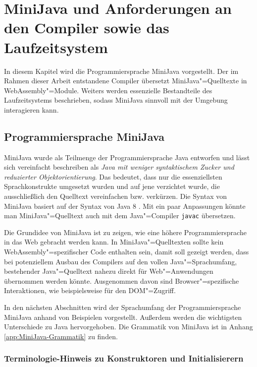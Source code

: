 \chapter{MiniJava und Anforderungen an den Compiler sowie das Laufzeitsystem}
\label{cha:MiniJava}

In diesem Kapitel wird die Programmiersprache MiniJava vorgestellt. Der im Rahmen dieser Arbeit entstandene Compiler übersetzt MiniJava"=Quelltexte in WebAssembly"=Module. Weiters werden essenzielle Bestandteile des Laufzeitsystems beschrieben, sodass MiniJava sinnvoll mit der Umgebung interagieren kann.

\section{Programmiersprache MiniJava}
\label{sec:Programmiersprache-MiniJava}

MiniJava wurde als Teilmenge der Programmiersprache Java entworfen und lässt sich vereinfacht beschreiben als \emph{Java mit weniger syntaktischem Zucker und reduzierter Objektorientierung}. Das bedeutet, dass nur die essenziellsten Sprachkonstrukte umgesetzt wurden und auf jene verzichtet wurde, die ausschließlich den Quelltext vereinfachen bzw. verkürzen. Die Syntax von MiniJava basiert auf der Syntax von Java 8 \cite{Java8Specification}. Mit ein paar Anpassungen könnte man MiniJava"=Quelltext auch mit dem Java"=Compiler \lstinline{javac} übersetzen.

Die Grundidee von MiniJava ist zu zeigen, wie eine höhere Programmiersprache in das Web gebracht werden kann. In MiniJava"=Quelltexten sollte kein WebAssembly"=spezifischer Code enthalten sein, damit soll gezeigt werden, dass bei potenziellem Ausbau des Compilers auf den vollen Java"=Sprachumfang, bestehender Java"=Quelltext nahezu direkt für Web"=Anwendungen übernommen werden könnte. Ausgenommen davon sind Browser"=spezifische Interaktionen, wie beispielsweise für den DOM"=Zugriff.

In den nächsten Abschnitten wird der Sprachumfang der Programmiersprache MiniJava anhand von Beispielen vorgestellt. Außerdem werden die wichtigsten Unterschiede zu Java hervorgehoben. Die Grammatik von MiniJava ist in Anhang \ref{app:MiniJava-Grammatik} zu finden.

\pagebreak
\subsection{Terminologie-Hinweis zu Konstruktoren und Initialisierern}

